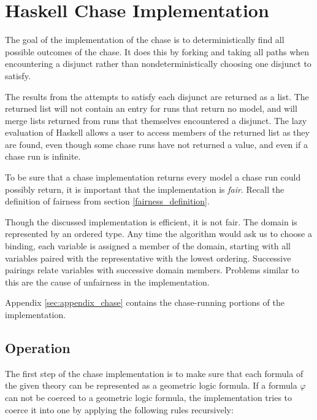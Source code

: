 \section{Haskell Chase Implementation}
\label{sec:implementation}

	The goal of the implementation of the chase is to deterministically find
	all possible outcomes of the chase. It does this by forking and taking all
	paths when encountering a disjunct rather than nondeterministically
	choosing one disjunct to satisfy.

	The results from the attempts to satisfy each disjunct are returned as a
	list. The returned list will not contain an entry for runs that return no
	model, and will merge lists returned from runs that themselves encountered
	a disjunct. The lazy evaluation of Haskell allows a user to access members
	of the returned list as they are found, even though some chase runs have
	not returned a value, and even if a chase run is infinite.

	To be sure that a chase implementation returns every model a chase run
	could possibly return, it is important that the implementation is
	\emph{fair}. Recall the definition of fairness from section
	\ref{fairness_definition}.

	Though the discussed implementation is efficient, it is not fair. The
	domain is represented by an ordered type. Any time the algorithm would ask
	us to choose a binding, each variable is assigned a member of the domain,
	starting with all variables paired with the representative with the lowest
	ordering. Successive pairings relate variables with successive domain
	members. Problems similar to this are the cause of unfairness in the
	implementation.

	Appendix \ref{sec:appendix_chase} contains the chase-running portions of the
	implementation.

	\subsection{Operation}

		The first step of the chase implementation is to make sure that each
		formula of the given theory can be represented as a geometric logic
		formula. If a formula $\varphi$ can not be coerced to a geometric logic
		formula, the implementation tries to coerce it into one by applying the
		following rules recursively:

